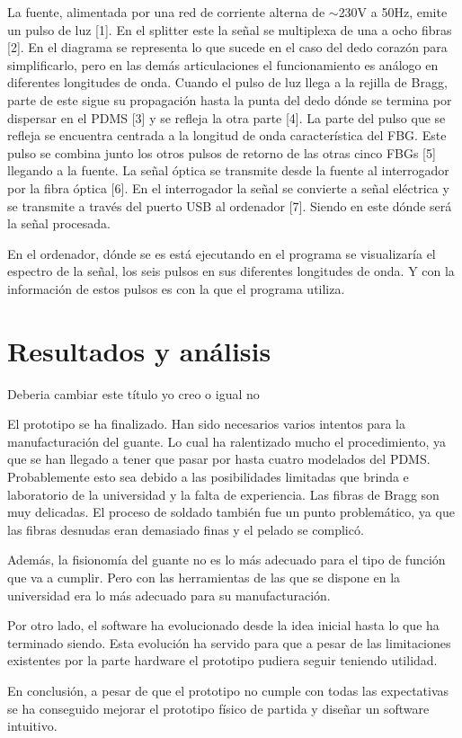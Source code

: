 La fuente, alimentada por una red de corriente alterna de $\sim$230V a 50Hz, emite un pulso de luz [1]. En el splitter este la señal se multiplexa de una a ocho fibras [2]. En el diagrama se representa lo que sucede en el caso del dedo corazón para simplificarlo, pero en las demás articulaciones el funcionamiento es análogo en diferentes longitudes de onda. Cuando el pulso de luz llega a la rejilla de Bragg, parte de este sigue su propagación hasta la punta del dedo dónde se termina por dispersar en el PDMS [3] y se refleja la otra parte [4]. La parte del pulso que se refleja se encuentra centrada a la longitud de onda característica del FBG. Este pulso se combina junto los otros pulsos de retorno de las otras cinco FBGs [5] llegando a la fuente. La señal óptica se transmite desde la fuente al interrogador por la fibra óptica [6]. En el interrogador la señal se convierte a señal eléctrica y se transmite a través del puerto USB al ordenador [7]. Siendo en este dónde será la señal procesada.

En el ordenador, dónde se es está ejecutando en el programa se visualizaría el espectro de la señal, los seis pulsos en sus diferentes longitudes de onda. Y con la información de estos pulsos es con la que el programa utiliza. 



\section{Resultados y análisis}
\label{sec:resultados3}

\textcolor{rositaoscuro}{Deberia cambiar este título yo creo o igual no}

El prototipo se ha finalizado. Han sido necesarios varios intentos para la manufacturación del guante. Lo cual ha ralentizado mucho el procedimiento, ya que se han llegado a tener que pasar por hasta cuatro modelados del PDMS. Probablemente esto sea debido a las posibilidades limitadas que brinda e laboratorio de la universidad y la falta de experiencia. Las fibras de Bragg son muy delicadas. El proceso de soldado también fue un punto problemático, ya que las fibras desnudas eran demasiado finas y el pelado se complicó. 

Además, la fisionomía del guante no es lo más adecuado para el tipo de función que va a cumplir. Pero con las herramientas de las que se dispone en la universidad era lo más adecuado para su manufacturación. 

Por otro lado, el software ha evolucionado desde la idea inicial hasta lo que ha terminado siendo. Esta evolución ha servido para que a pesar de las limitaciones existentes por la parte hardware el prototipo pudiera seguir teniendo utilidad.

En conclusión, a pesar de que el prototipo no cumple con todas las expectativas se ha conseguido mejorar el prototipo físico de partida y diseñar un software intuitivo.

